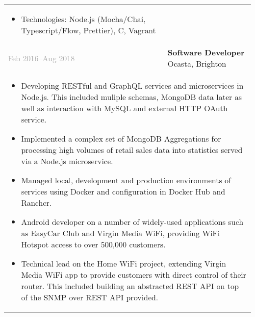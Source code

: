 \documentclass{article}
\newenvironment{exptable}{
  \begin{longtable}{lp{0.8\textwidth}}
  }{
  \end{longtable}
}
\begin{document}
\begin{exptable}
{        \vspace{1em}

        \begin{itemize}[leftmargin=1em]
          \item[] Technologies: Node.js (Mocha/Chai, Typescript/Flow, Prettier), C, Vagrant
        \end{itemize}
      } \\
      \textcolor{darkgray}{Feb 2016--Aug 2018} & \textbf{Software Developer} Ocasta, Brighton \\
      \multicolumn{2}{p{\textwidth}}{
        \begin{itemize}
          \item Developing RESTful and GraphQL services and microservices in Node.js. This included muliple schemas, MongoDB data later as well as interaction with MySQL and external HTTP OAuth service.
          \item Implemented a complex set of MongoDB Aggregations for processing high volumes of retail sales data into statistics served via a Node.js microservice.
          \item Managed local, development and production environments of services using Docker and configuration in Docker Hub and Rancher.
          \item Android developer on a number of widely-used applications such as EasyCar Club and Virgin Media WiFi, providing WiFi Hotspot access to over 500,000 customers.
          \item Technical lead on the Home WiFi project, extending Virgin Media WiFi app to provide customers with direct control of their router. This included building an abstracted REST API on top of the SNMP over REST API provided.
        \end{itemize}

        \vspace{1em}

}
\end{exptable}
\end{document}

